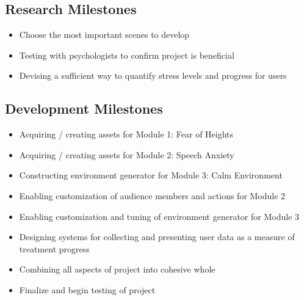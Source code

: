 \documentclass[a4paper,10pt]{article}
\begin{document}
	\subsection{Research Milestones}
		\begin{itemize}
			\item Choose the most important scenes to develop
			\item Testing with psychologists to confirm project is beneficial
			\item Devising a sufficient way to quantify stress levels and progress for users
		\end{itemize}
	\subsection{Development Milestones}
		\begin{itemize}
			\item Acquiring / creating assets for Module 1: Fear of Heights
			\item Acquiring / creating assets for Module 2: Speech Anxiety
			\item Constructing environment generator for Module 3: Calm Environment
			\item Enabling customization of audience members and actions for Module 2
			\item Enabling customization and tuning of environment generator for Module 3
			\item Designing systems for collecting and presenting user data as a measure of treatment progress
			\item Combining all aspects of project into cohesive whole
			\item Finalize and begin testing of project
		\end{itemize}

\pagebreak
\end{document}
